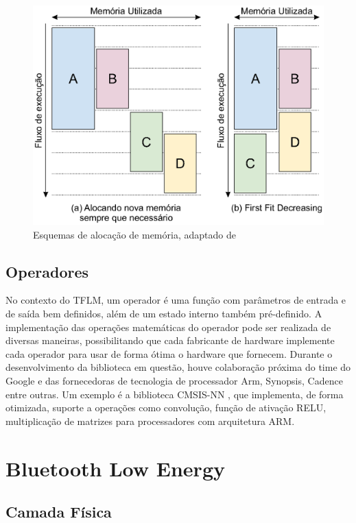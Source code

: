\documentclass[a5paper]{ufsc-thesis}  %
\begin{document}
\begin{figure}[h]
    \centering
    \includegraphics[width=0.8\linewidth]{imagens/first_fit_mem_alloc.eps}
    \caption{Esquemas de alocação de memória, adaptado de \cite{tflu}}
    \label{fig:first_fit_mem_alloc}
\end{figure}

\section{Operadores}
No contexto do TFLM, um operador é uma função com parâmetros de entrada e de saída bem definidos, além de um estado interno também pré-definido. A implementação das operações matemáticas do operador pode ser realizada de diversas maneiras, possibilitando que cada fabricante de hardware implemente cada operador para usar de forma ótima o hardware que fornecem. Durante o desenvolvimento da biblioteca em questão, houve colaboração próxima do time do Google e das fornecedoras de tecnologia de processador Arm, Synopsis, Cadence entre outras. Um exemplo é a biblioteca CMSIS-NN \cite{cmsis_nn}, que implementa, de forma otimizada, suporte a operações como convolução, função de ativação RELU, multiplicação de matrizes para processadores com arquitetura ARM.

\chapter{Bluetooth Low Energy}

\section{Camada Física}
\end{document}
